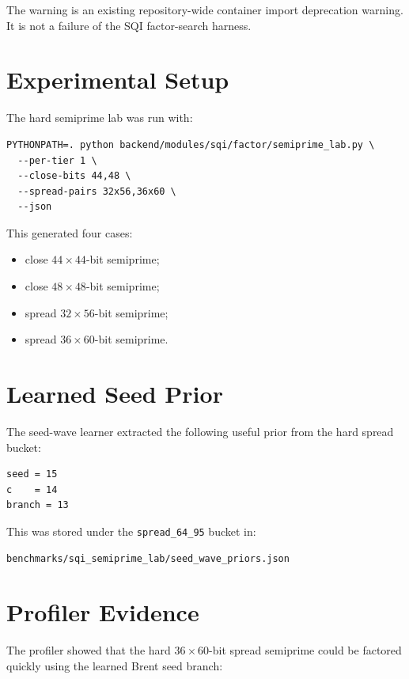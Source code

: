 \documentclass[11pt,a4paper]{article}
\begin{document}
The warning is an existing repository-wide container import deprecation warning. It is not
a failure of the SQI factor-search harness.

\section{Experimental Setup}

The hard semiprime lab was run with:

\begin{verbatim}
PYTHONPATH=. python backend/modules/sqi/factor/semiprime_lab.py \
  --per-tier 1 \
  --close-bits 44,48 \
  --spread-pairs 32x56,36x60 \
  --json
\end{verbatim}

This generated four cases:

\begin{itemize}
  \item close \(44 \times 44\)-bit semiprime;
  \item close \(48 \times 48\)-bit semiprime;
  \item spread \(32 \times 56\)-bit semiprime;
  \item spread \(36 \times 60\)-bit semiprime.
\end{itemize}

\section{Learned Seed Prior}

The seed-wave learner extracted the following useful prior from the hard spread bucket:

\begin{verbatim}
seed = 15
c    = 14
branch = 13
\end{verbatim}

This was stored under the \texttt{spread\_64\_95} bucket in:

\begin{verbatim}
benchmarks/sqi_semiprime_lab/seed_wave_priors.json
\end{verbatim}

\section{Profiler Evidence}

The profiler showed that the hard \(36 \times 60\)-bit spread semiprime could be factored
quickly using the learned Brent seed branch:
\end{document}
